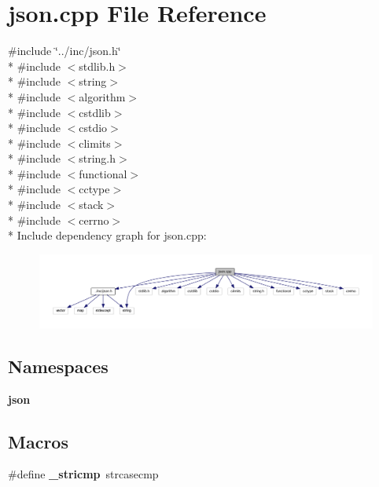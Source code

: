 \section{json.\+cpp File Reference}
\label{json_8cpp}
{\ttfamily \#include \char`\"{}../inc/json.\+h\char`\"{}}\\*
{\ttfamily \#include $<$stdlib.\+h$>$}\\*
{\ttfamily \#include $<$string$>$}\\*
{\ttfamily \#include $<$algorithm$>$}\\*
{\ttfamily \#include $<$cstdlib$>$}\\*
{\ttfamily \#include $<$cstdio$>$}\\*
{\ttfamily \#include $<$climits$>$}\\*
{\ttfamily \#include $<$string.\+h$>$}\\*
{\ttfamily \#include $<$functional$>$}\\*
{\ttfamily \#include $<$cctype$>$}\\*
{\ttfamily \#include $<$stack$>$}\\*
{\ttfamily \#include $<$cerrno$>$}\\*
Include dependency graph for json.\+cpp\+:
\nopagebreak
\begin{figure}[H]
\begin{center}
\leavevmode
\includegraphics[width=350pt]{json_8cpp__incl}
\end{center}
\end{figure}
\subsection*{Namespaces}
\begin{DoxyCompactItemize}
\item 
 {\bf json}
\end{DoxyCompactItemize}
\subsection*{Macros}
\begin{DoxyCompactItemize}
\item 
\#define {\bf \+\_\+stricmp}~strcasecmp
\end{DoxyCompactItemize}
